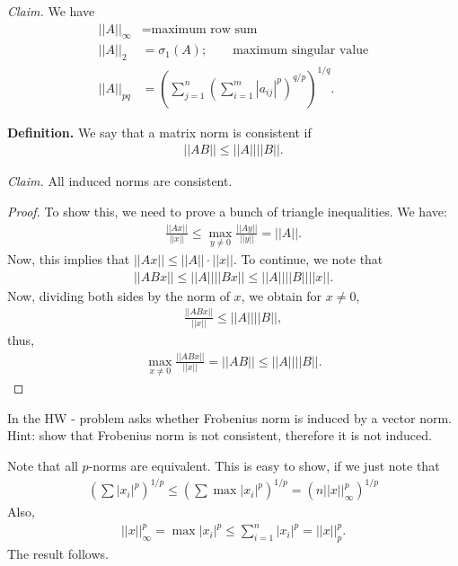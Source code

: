 \documentclass{article}
\begin{document}
{\it Claim.} We have
\begin{align*}
  ||A||_{\infty} &= \text{maximum row sum} \\
  ||A||_2 &= \sigma_1(A); \qquad \text{maximum singular value} \\
  ||A||_{pq} &= \left( \sum_{j=1}^{n}  \left( \sum_{i=1}^{m} |a_{ij}|^{p} \right)^{q/p}\right)^{1/q}.
\end{align*}

{\bf Definition.} We say that a matrix norm is consistent if
\begin{align*}
  ||A B|| \leq ||A|| ||B||.
\end{align*}

{\it Claim.} All induced norms are consistent.

\begin{proof}
  To show this, we need to prove a bunch of triangle inequalities.  We have:
  \begin{align*}
    \frac{||A x||}{||x||} \leq \max_{y \neq 0} \frac{||A y||}{||y||} = ||A||.
  \end{align*}
  Now,  this implies that $||A x|| \leq ||A|| \cdot ||x||$.  To continue, we note that
  \begin{align*}
    ||A B x|| \leq ||A|| ||B x|| \leq ||A|| ||B|| ||x||.
  \end{align*}
  Now, dividing both sides by the norm of $x$, we obtain for $x \neq 0$,
  \begin{align*}
    \frac{||ABx||}{||x||} \leq ||A|| ||B||,
  \end{align*}
  thus,
  \begin{align*}
    \max_{x \neq 0} \frac{||A B x||}{||x||} = ||AB|| \leq ||A || ||B||.
  \end{align*}

\end{proof}

In the HW - problem asks whether Frobenius norm is induced by a vector norm.  Hint: show that Frobenius norm is not consistent, therefore it is not induced.

Note that all $p$-norms are equivalent.  This is easy to show, if we just note that
\begin{align*}
  \left( \sum |x_i|^p \right)^{1/p} \leq \left( \sum \max |x_i|^p \right)^{1/p} = \left( n ||x||_{\infty}^{p} \right)^{1/p}
\end{align*}
Also,
\begin{align*}
  ||x||_{\infty}^{p} = \max |x_i|^p \leq \sum_{i=1}^{n} |x_i|^p = ||x||_p^p.
\end{align*}
The result follows.
\end{document}
